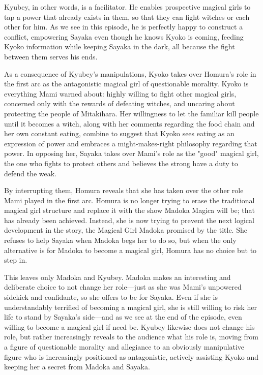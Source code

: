 Kyubey, in other words, is a facilitator. He enables prospective magical girls to tap a power that already exists in them, so that they can fight witches or each other for him. As we see in this episode, he is perfectly happy to construct a conflict, empowering Sayaka even though he knows Kyoko is coming, feeding Kyoko information while keeping Sayaka in the dark, all because the fight between them serves his ends. 

As a consequence of Kyubey's manipulations, Kyoko takes over Homura's role in the first arc as the antagonistic magical girl of questionable morality. Kyoko is everything Mami warned about: highly willing to fight other magical girls, concerned only with the rewards of defeating witches, and uncaring about protecting the people of Mitakihara. Her willingness to let the familiar kill people until it becomes a witch, along with her comments regarding the food chain and her own constant eating, combine to suggest that Kyoko sees eating as an expression of power and embraces a might-makes-right philosophy regarding that power. In opposing her, Sayaka takes over Mami's role as the "good" magical girl, the one who fights to protect others and believes the strong have a duty to defend the weak.

By interrupting them, Homura reveals that she has taken over the other role Mami played in the first arc. Homura is no longer trying to erase the traditional magical girl structure and replace it with the show Madoka Magica will be; that has already been achieved. Instead, she is now trying to prevent the next logical development in the story, the Magical Girl Madoka promised by the title. She refuses to help Sayaka when Madoka begs her to do so, but when the only alternative is for Madoka to become a magical girl, Homura has no choice but to step in.

This leaves only Madoka and Kyubey. Madoka makes an interesting and deliberate choice to not change her role—just as she was Mami's unpowered sidekick and confidante, so she offers to be for Sayaka. Even if she is understandably terrified of becoming a magical girl, she is still willing to risk her life to stand by Sayaka's side—and as we see at the end of the episode, even willing to become a magical girl if need be. Kyubey likewise does not change his role, but rather increasingly reveals to the audience what his role is, moving from a figure of questionable morality and allegiance to an obviously manipulative figure who is increasingly positioned as antagonistic, actively assisting Kyoko and keeping her a secret from Madoka and Sayaka.


